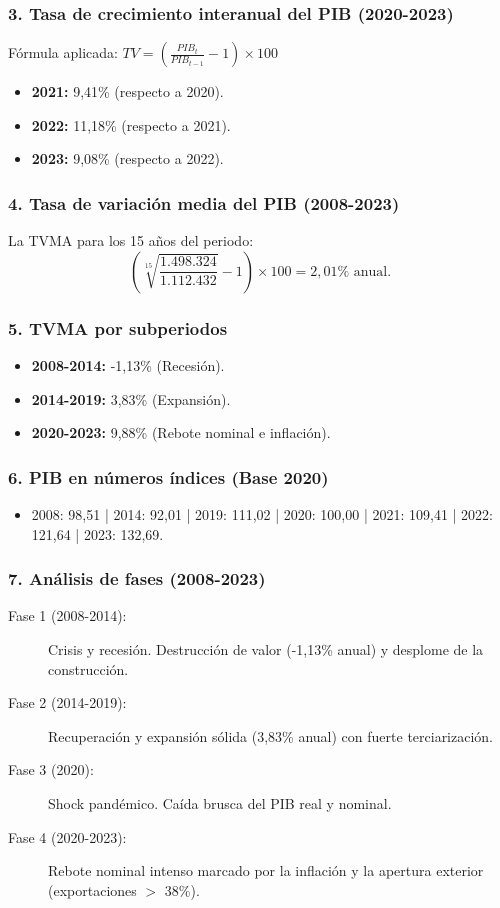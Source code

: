 \subsubsection{3. Tasa de crecimiento interanual del PIB (2020-2023)}
Fórmula aplicada: $TV = \left(\frac{PIB_t}{PIB_{t-1}} - 1\right) \times 100$
\begin{itemize}
    \item \textbf{2021:} 9,41\% (respecto a 2020).
    \item \textbf{2022:} 11,18\% (respecto a 2021).
    \item \textbf{2023:} 9,08\% (respecto a 2022).
\end{itemize}

\subsubsection{4. Tasa de variación media del PIB (2008-2023)}
La TVMA para los 15 años del periodo:
\[ \left( \sqrt[15]{\frac{1.498.324}{1.112.432}} - 1 \right) \times 100 = 2,01\% \text{ anual.} \]

\subsubsection{5. TVMA por subperiodos}
\begin{itemize}
    \item \textbf{2008-2014:} -1,13\% (Recesión).
    \item \textbf{2014-2019:} 3,83\% (Expansión).
    \item \textbf{2020-2023:} 9,88\% (Rebote nominal e inflación).
\end{itemize}

\subsubsection{6. PIB en números índices (Base 2020)}
\begin{itemize}
    \item 2008: 98,51 | 2014: 92,01 | 2019: 111,02 | 2020: 100,00 | 2021: 109,41 | 2022: 121,64 | 2023: 132,69.
\end{itemize}

\subsubsection{7. Análisis de fases (2008-2023)}
\begin{description}
    \item[Fase 1 (2008-2014):] Crisis y recesión. Destrucción de valor (-1,13\% anual) y desplome de la construcción.
    \item[Fase 2 (2014-2019):] Recuperación y expansión sólida (3,83\% anual) con fuerte terciarización.
    \item[Fase 3 (2020):] Shock pandémico. Caída brusca del PIB real y nominal.
    \item[Fase 4 (2020-2023):] Rebote nominal intenso marcado por la inflación y la apertura exterior (exportaciones $>$ 38\%).
\end{description}

